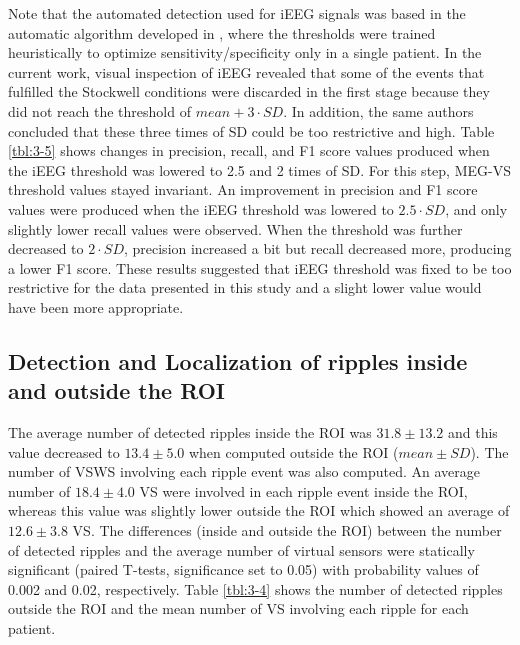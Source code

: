 Note that the automated detection used for iEEG signals was based in the automatic algorithm developed in \citep{Burnos2014}, where the thresholds were trained heuristically to optimize sensitivity/specificity only in a single patient. In the current work, visual inspection of iEEG revealed that some of the events that fulfilled the Stockwell conditions were discarded in the first stage because they did not reach the threshold of $mean+3 \cdot SD$. In addition, the same authors concluded that these three times of SD could be too restrictive and high. Table \ref{tbl:3-5} shows changes in precision, recall, and F1 score values produced when the iEEG threshold was lowered to 2.5 and 2 times of SD. For this step, MEG-VS threshold values stayed invariant. An improvement in precision and F1 score values were produced when the iEEG threshold was lowered to $2.5 \cdot SD$, and only slightly lower recall values were observed. When the threshold was further decreased to $2 \cdot SD$, precision increased a bit but recall decreased more, producing a lower F1 score. These results suggested that iEEG threshold was fixed to be too restrictive for the data presented in this study and a slight lower value would have been more appropriate.

\subsection{Detection and Localization of ripples inside and outside the ROI}

The average number of detected ripples inside the ROI was $31.8 \pm 13.2$ and this value decreased to $13.4 \pm 5.0$ when computed outside the ROI ($mean \pm SD$). The number of VSWS involving each ripple event was also computed. An average number of $18.4 \pm 4.0$ VS were involved in each ripple event inside the ROI, whereas this value was slightly lower outside the ROI which showed an average of $12.6 \pm 3.8$ VS. The differences (inside and outside the ROI) between the number of detected ripples and the average number of virtual sensors were statically significant (paired T-tests, significance set to 0.05) with probability values of 0.002 and 0.02, respectively. Table \ref{tbl:3-4} shows the number of detected ripples outside the ROI and the mean number of VS involving each ripple for each patient.

